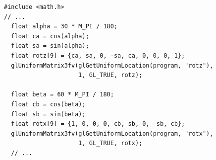 \documentclass[calcdimensions,landscape,letterpaper]{powersem}
\newcommand{\thecurrentheading}{}
\newcommand{\heading}[1]{\renewcommand{\thecurrentheading}{#1}}
\begin{document}
\begin{slide}
    \heading{Uniform RotationMatrices}
    \begin{center}
        \begin{minipage}[c]{.95\textwidth}
            \begin{verbatim}
#include <math.h>
// ...
  float alpha = 30 * M_PI / 180;
  float ca = cos(alpha);
  float sa = sin(alpha);
  float rotz[9] = {ca, sa, 0, -sa, ca, 0, 0, 0, 1};
  glUniformMatrix3fv(glGetUniformLocation(program, "rotz"),
                     1, GL_TRUE, rotz);

  float beta = 60 * M_PI / 180;
  float cb = cos(beta);
  float sb = sin(beta);
  float rotx[9] = {1, 0, 0, 0, cb, sb, 0, -sb, cb};
  glUniformMatrix3fv(glGetUniformLocation(program, "rotx"),
                     1, GL_TRUE, rotx);
  // ...
            \end{verbatim}
        \end{minipage}
    \end{center}
\end{slide}

\begin{slide}
    \heading{Rotated Quad}
    \begin{center}
    \end{center}
\end{slide}
\end{document}
